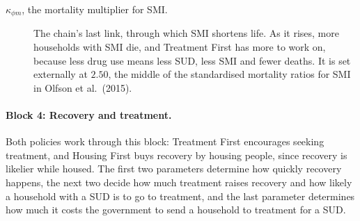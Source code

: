\documentclass[10pt]{article}
\begin{document}
\begin{description}
\item[$\kappa_{\phi m}$, the mortality multiplier for SMI.] The chain's last link, through which SMI shortens life. As it rises, more households with SMI die, and Treatment First has more to work on, because less drug use means less SUD, less SMI and fewer deaths. It is set externally at $2.50$, the middle of the standardised mortality ratios for SMI in Olfson et al.\ (2015).
\end{description}

\paragraph{Block 4: Recovery and treatment.} Both policies work through this block: Treatment First encourages seeking treatment, and Housing First buys recovery by housing people, since recovery is likelier while housed.  The first two parameters determine how quickly recovery happens, the next two decide how much treatment raises recovery and how likely a household with a SUD is to go to treatment, and the last parameter determines how much it costs the government to send a household to treatment for a SUD.
\end{document}
